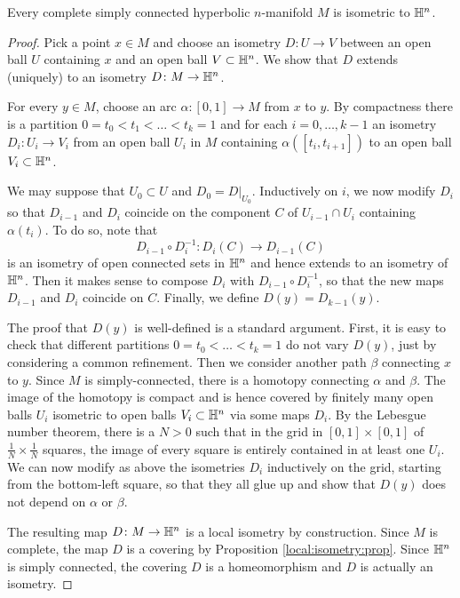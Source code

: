 \begin{teo} \label{simply:teo}
Every complete simply connected hyperbolic $n$-manifold $M$ is isometric to $\mathbb{H}^n$.
\end{teo}
\begin{proof}
Pick a point $x\in M$ and choose an isometry $D\colon U \to V$ between an open ball $U$ containing $x$ and an open ball $V\subset \mathbb{H}^n$. 
We show that $D$ extends (uniquely) to an isometry $D\colon M\to\mathbb{H}^n$. 

For every $y \in M$, choose an arc $\alpha\colon [0,1]\to M$ from $x$ to $y$. By compactness there is a partition $0=t_0 < t_1 < \ldots < t_k =1$ and for each $i=0,\ldots, k-1$ an isometry $D_i\colon U_i \to V_i$ from an open ball $U_i$ in $M$ containing $\alpha([t_i,t_{i+1}])$ to an open ball $V_i\subset \mathbb{H}^n$. 

We may suppose that $U_0 \subset U$ and $D_0 = D|_{U_0}$. Inductively on $i$, we now modify $D_i$ so that $D_{i-1}$ and $D_i$ coincide on the component $C$ of $U_{i-1}\cap U_i$ containing $\alpha(t_i)$. To do so, note that
$$D_{i-1}\circ D_i^{-1}\colon D_i(C) \longrightarrow D_{i-1}(C)$$
is an isometry of open connected sets in $\mathbb{H}^n$ and hence extends to an isometry of $\mathbb{H}^n$. Then it makes sense to compose $D_i$ with $D_{i-1}\circ D_i^{-1}$, so that the new maps $D_{i-1}$ and $D_i$ coincide on $C$. Finally, we define $D(y) = D_{k-1}(y)$.

The proof that $D(y)$ is well-defined is a standard argument. First, it is easy to check that different partitions $0=t_0 <\ldots <t_k=1$ do not vary $D(y)$, just by considering a common refinement. Then we consider another path $\beta$ connecting $x$ to $y$. Since $M$ is simply-connected, there is a homotopy connecting $\alpha$ and $\beta$. The image of the homotopy is compact and is hence covered by finitely many open balls $U_i$ isometric to open balls $V_i\subset \mathbb{H}^n$ via some maps $D_i$. By the Lebesgue number theorem, there is a $N>0$ such that in the grid in $[0,1]\times [0,1]$ of $\frac 1N \times \frac 1N$ squares, the image of every square is entirely contained in at least one $U_i$. We can now modify as above the isometries $D_i$ inductively on the grid, starting from the bottom-left square, so that they all glue up and show that $D(y)$ does not depend on $\alpha$ or $\beta$.

The resulting map $D\colon M \to \mathbb{H}^n$ is a local isometry by construction. Since $M$ is complete, the map $D$ is a covering by Proposition \ref{local:isometry:prop}. Since $\mathbb{H}^n$ is simply connected, the covering $D$ is a homeomorphism and $D$ is actually an isometry.
\end{proof}

